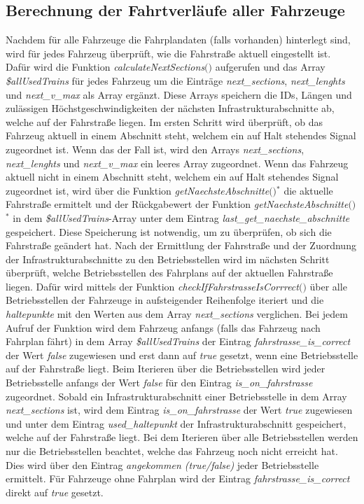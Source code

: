 \subsection{Berechnung der Fahrtverläufe aller Fahrzeuge} \label{main_3}
Nachdem für alle Fahrzeuge die Fahrplandaten (falls vorhanden) hinterlegt sind, wird für jedes Fahrzeug überprüft, wie die Fahrstraße aktuell eingestellt ist. Dafür wird die Funktion \textit{calculateNextSections$($$)$} aufgerufen und das Array \textit{\$allUsedTrains} für jedes Fahrzeug um die Einträge \textit{next\_sections}, \textit{next\_lenghts} und \textit{next\_v\_max} als Array ergänzt. Diese Arrays speichern die IDs, Längen und zulässigen Höchstgeschwindigkeiten der nächsten Infrastrukturabschnitte ab, welche auf der Fahrstraße liegen. Im ersten Schritt wird überprüft, ob das Fahrzeug aktuell in einem Abschnitt steht, welchem ein auf Halt stehendes Signal zugeordnet ist. Wenn das der Fall ist, wird den Arrays \textit{next\_sections}, \textit{next\_lenghts} und \textit{next\_v\_max} ein leeres Array zugeordnet. Wenn das Fahrzeug aktuell nicht in einem Abschnitt steht, welchem ein auf Halt stehendes Signal zugeordnet ist, wird über die Funktion \textit{getNaechsteAbschnitte$($$)$}$^\ast$ die aktuelle Fahrstraße ermittelt und der Rückgabewert der Funktion \textit{getNaechsteAbschnitte$($$)$}$^\ast$ in dem \textit{\$allUsedTrains}-Array unter dem Eintrag \textit{last\_get\_naechste\_abschnitte} gespeichert. Diese Speicherung ist notwendig, um zu überprüfen, ob sich die Fahrstraße geändert hat. Nach der Ermittlung der Fahrstraße und der Zuordnung der Infrastrukturabschnitte zu den Betriebsstellen wird im nächsten Schritt überprüft, welche Betriebsstellen des Fahrplans auf der aktuellen Fahrstraße liegen. Dafür wird mittels der Funktion \textit{checkIfFahrstrasseIsCorrrect$($$)$} über alle Betriebsstellen der Fahrzeuge in aufsteigender Reihenfolge iteriert und die \textit{haltepunkte} mit den Werten aus dem Array \textit{next\_sections} verglichen. Bei jedem Aufruf der Funktion wird dem Fahrzeug anfangs (falls das Fahrzeug nach Fahrplan fährt) in dem Array \textit{\$allUsedTrains} der Eintrag \textit{fahrstrasse\_is\_correct} der Wert \textit{false} zugewiesen und erst dann auf \textit{true} gesetzt, wenn eine Betriebsstelle auf der Fahrstraße liegt. Beim Iterieren über die Betriebsstellen wird jeder Betriebsstelle anfangs der Wert \textit{false} für den Eintrag \textit{is\_on\_fahrstrasse} zugeordnet. Sobald ein Infrastrukturabschnitt einer Betriebsstelle in dem Array \textit{next\_sections} ist, wird dem Eintrag \textit{is\_on\_fahrstrasse} der Wert \textit{true} zugewiesen und unter dem Eintrag \textit{used\_haltepunkt} der Infrastrukturabschnitt gespeichert, welche auf der Fahrstraße liegt. Bei dem Iterieren über alle Betriebsstellen werden nur die Betriebsstellen beachtet, welche das Fahrzeug noch nicht erreicht hat. Dies wird über den Eintrag \textit{angekommen (true/false)} jeder Betriebsstelle ermittelt. Für Fahrzeuge ohne Fahrplan wird der Eintrag \textit{fahrstrasse\_is\_correct} direkt auf \textit{true} gesetzt.

